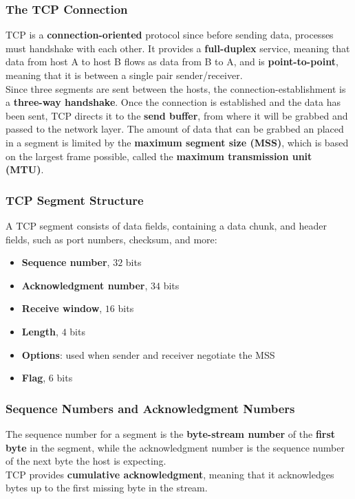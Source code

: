 \documentclass{article}
\begin{document}
\subsubsection{The TCP Connection}
TCP is a \textbf{connection-oriented} protocol since before sending data, processes must handshake with each other. It provides a \textbf{full-duplex} service, meaning that data from host A to host B flows as data from B to A, and is \textbf{point-to-point}, meaning that it is between a single pair sender/receiver. \\ Since three segments are sent between the hosts, the connection-establishment is a \textbf{three-way handshake}. Once the connection is established and the data has been sent, TCP directs it to the \textbf{send buffer}, from where it will be grabbed and passed to the network layer. The amount of data that can be grabbed an placed in a segment is limited by the \textbf{maximum segment size (MSS)}, which is based on the largest frame possible, called the \textbf{maximum transmission unit (MTU)}.
\subsubsection{TCP Segment Structure}
A TCP segment consists of data fields, containing a data chunk, and header fields, such as port numbers, checksum, and more:
\begin{itemize}
    \item \textbf{Sequence number}, $32$ bits
    \item \textbf{Acknowledgment number}, $34$ bits
    \item \textbf{Receive window}, $16$ bits
    \item \textbf{Length}, $4$ bits 
    \item \textbf{Options}: used when sender and receiver negotiate the MSS
    \item \textbf{Flag}, $6$ bits
\end{itemize}
\subsubsection*{Sequence Numbers and Acknowledgment Numbers}
The sequence number for a segment is the \textbf{byte-stream number} of the \textbf{first byte} in the segment, while the acknowledgment number is the sequence number of the next byte the host is expecting. \\ TCP provides \textbf{cumulative acknowledgment}, meaning that it acknowledges bytes up to the first missing byte in the stream.
\end{document}
